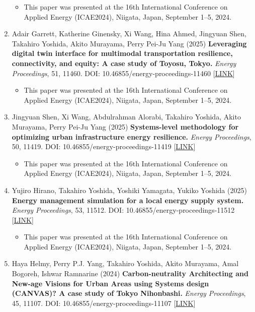 \documentclass[
]{book}
\providecommand{\tightlist}{%
  \setlength{\itemsep}{0pt}\setlength{\parskip}{0pt}}
\begin{document}
\begin{enumerate}
  \begin{itemize}
  \tightlist
  \item
    This paper was presented at the 16th International Conference on Applied Energy (ICAE2024), Niigata, Japan, September 1--5, 2024.
  \end{itemize}
\item
  Adair Garrett, Katherine Ginensky, Xi Wang, Hina Ahmed, Jingyuan Shen, Takahiro Yoshida, Akito Murayama, Perry Pei-Ju Yang (2025)
  \textbf{Leveraging digital twin interface for multimodal transportation resilience, connectivity, and equity: A case study of Toyosu, Tokyo.}
  \emph{Energy Proceedings}, 51, 11460.
  DOI: 10.46855/energy-proceedings-11460 {[}\href{https://doi.org/10.46855/energy-proceedings-11460}{LINK}{]}

  \begin{itemize}
  \tightlist
  \item
    This paper was presented at the 16th International Conference on Applied Energy (ICAE2024), Niigata, Japan, September 1--5, 2024.
  \end{itemize}
\item
  Jingyuan Shen, Xi Wang, Abdulrahman Alorabi, Takahiro Yoshida, Akito Murayama, Perry Pei-Ju Yang (2025)
  \textbf{Systems-level methodology for optimizing urban infrastructure energy resilience.}
  \emph{Energy Proceedings}, 50, 11419.
  DOI: 10.46855/energy-proceedings-11419 {[}\href{https://doi.org/10.46855/energy-proceedings-11419}{LINK}{]}

  \begin{itemize}
  \tightlist
  \item
    This paper was presented at the 16th International Conference on Applied Energy (ICAE2024), Niigata, Japan, September 1--5, 2024.
  \end{itemize}
\item
  Yujiro Hirano, Takahiro Yoshida, Yoshiki Yamagata, Yukiko Yoshida (2025)
  \textbf{Energy management simulation for a local energy supply system.}
  \emph{Energy Proceedings}, 53, 11512.
  DOI: 10.46855/energy-proceedings-11512 {[}\href{https://doi.org/10.46855/energy-proceedings-11512}{LINK}{]}

  \begin{itemize}
  \tightlist
  \item
    This paper was presented at the 16th International Conference on Applied Energy (ICAE2024), Niigata, Japan, September 1--5, 2024.
  \end{itemize}
\item
  Haya Helmy, Perry P.J. Yang, Takahiro Yoshida, Akito Murayama, Amal Bogoreh, Ishwar Ramnarine (2024)
  \textbf{Carbon-neutrality Architecting and New-age Visions for Urban Areas using Systems design (CANVAS)? A case study of Tokyo Nihonbashi.}
  \emph{Energy Proceedings}, 45, 11107.
  DOI: 10.46855/energy-proceedings-11107 {[}\href{https://doi.org/10.46855/energy-proceedings-11107}{LINK}{]}


\end{enumerate}
\end{document}
